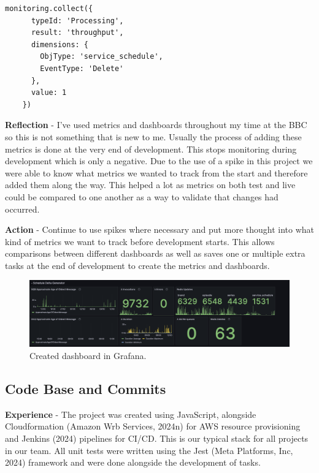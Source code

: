    \begin{lstlisting}[caption=Code used to update a metric\, this variation tracks a schedule delete.]
    monitoring.collect({
      typeId: 'Processing',
      result: 'throughput',
      dimensions: {
        ObjType: 'service_schedule',
        EventType: 'Delete'
      },
      value: 1
    })
  \end{lstlisting}

  \textbf{Reflection} - I've used metrics and dashboards throughout my time at the BBC so this is not something that is new to me. Usually the process of 
  adding these metrics is done at the very end of development. This stops monitoring during development which is only a negative. Due to the use of a spike 
  in this project we were able to know what metrics we wanted to track from the start and therefore added them along the way. This helped a lot as metrics on 
  both test and live could be compared to one another as a way to validate that changes had occurred.
  
  \vspace{0.2cm}
  \textbf{Action} - Continue to use spikes where necessary and put more thought into what kind of metrics we want to track before development starts.
  This allows comparisons between different dashboards as well as saves one or multiple extra tasks at the end of development to create the metrics and
  dashboards.

  \begin{figure}[H]
    \centering
    \includegraphics[width=12cm]{assets/outputs/dashboard.png}
    \caption{Created dashboard in Grafana.}
    \label{fig:dashboard}
  \end{figure}
  
  \newpage
  \subsection{Code Base and Commits}

  \textbf{Experience} - The project was created using JavaScript, alongside Cloudformation (Amazon Wrb Services, 2024n) for AWS resource provisioning and 
  Jenkins (2024) pipelines for CI/CD. This is our typical stack for all projects in our team. All unit tests were written using the Jest 
  (Meta Platforms, Inc, 2024) framework and were done alongside the development of tasks.

